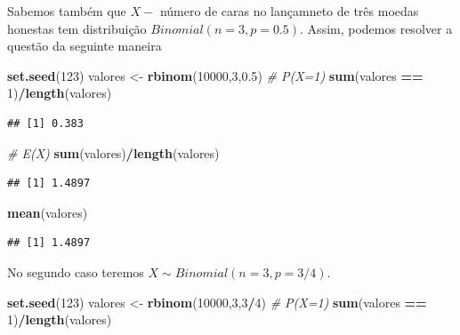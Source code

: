 \documentclass[
]{book}
\newenvironment{Shaded}{\begin{snugshade}}{\end{snugshade}}
\newcommand{\CommentTok}[1]{\textcolor[rgb]{0.56,0.35,0.01}{\textit{#1}}}
\newcommand{\DecValTok}[1]{\textcolor[rgb]{0.00,0.00,0.81}{#1}}
\newcommand{\FloatTok}[1]{\textcolor[rgb]{0.00,0.00,0.81}{#1}}
\newcommand{\FunctionTok}[1]{\textcolor[rgb]{0.13,0.29,0.53}{\textbf{#1}}}
\newcommand{\NormalTok}[1]{#1}
\newcommand{\OtherTok}[1]{\textcolor[rgb]{0.56,0.35,0.01}{#1}}
\newcommand{\SpecialCharTok}[1]{\textcolor[rgb]{0.81,0.36,0.00}{\textbf{#1}}}
\begin{document}
Sabemos também que \(X-\) número de caras no lançamneto de três moedas
honestas tem distribuição \(Binomial(n=3,p=0.5)\). Assim, podemos resolver
a questão da seguinte maneira

\begin{Shaded}
\begin{Highlighting}[]
\FunctionTok{set.seed}\NormalTok{(}\DecValTok{123}\NormalTok{)}
\NormalTok{valores }\OtherTok{\textless{}{-}} \FunctionTok{rbinom}\NormalTok{(}\DecValTok{10000}\NormalTok{,}\DecValTok{3}\NormalTok{,}\FloatTok{0.5}\NormalTok{)}
\CommentTok{\# P(X=1)}
\FunctionTok{sum}\NormalTok{(valores }\SpecialCharTok{==} \DecValTok{1}\NormalTok{)}\SpecialCharTok{/}\FunctionTok{length}\NormalTok{(valores)}
\end{Highlighting}
\end{Shaded}

\begin{verbatim}
## [1] 0.383
\end{verbatim}

\begin{Shaded}
\begin{Highlighting}[]
\CommentTok{\# E(X)}
\FunctionTok{sum}\NormalTok{(valores)}\SpecialCharTok{/}\FunctionTok{length}\NormalTok{(valores)}
\end{Highlighting}
\end{Shaded}

\begin{verbatim}
## [1] 1.4897
\end{verbatim}

\begin{Shaded}
\begin{Highlighting}[]
\FunctionTok{mean}\NormalTok{(valores)}
\end{Highlighting}
\end{Shaded}

\begin{verbatim}
## [1] 1.4897
\end{verbatim}

No segundo caso teremos \(X \sim Binomial(n=3,p=3/4)\).

\begin{Shaded}
\begin{Highlighting}[]
\FunctionTok{set.seed}\NormalTok{(}\DecValTok{123}\NormalTok{)}
\NormalTok{valores }\OtherTok{\textless{}{-}} \FunctionTok{rbinom}\NormalTok{(}\DecValTok{10000}\NormalTok{,}\DecValTok{3}\NormalTok{,}\DecValTok{3}\SpecialCharTok{/}\DecValTok{4}\NormalTok{)}
\CommentTok{\# P(X=1)}
\FunctionTok{sum}\NormalTok{(valores }\SpecialCharTok{==} \DecValTok{1}\NormalTok{)}\SpecialCharTok{/}\FunctionTok{length}\NormalTok{(valores)}
\end{Highlighting}
\end{Shaded}
\end{document}
